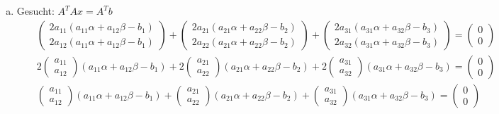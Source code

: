\documentclass[11pt]{article} %
\begin{document}
\begin{enumerate}[a)]
\item Gesucht: $A^TAx = A^Tb$
\begin{eqnarray*}
&&\begin{pmatrix} 2a_{11}(a_{11}\alpha + a_{12}\beta - b_1) \\ 2a_{12}(a_{11}\alpha + a_{12}\beta - b_1)
\end{pmatrix} + 
\begin{pmatrix} 2a_{21}(a_{21}\alpha + a_{22}\beta - b_2) \\  2a_{22}(a_{21}\alpha + a_{22}\beta - b_2)
\end{pmatrix} + 
\begin{pmatrix} 2a_{31}(a_{31}\alpha + a_{32}\beta - b_3) \\ 2a_{32}(a_{31}\alpha + a_{32}\beta - b_3)
\end{pmatrix} = \begin{pmatrix}0 \\ 0 \end{pmatrix} \\
&& 2\begin{pmatrix}a_{11}\\a_{12}\end{pmatrix}(a_{11}\alpha + a_{12}\beta - b_1)
+ 2\begin{pmatrix}a_{21}\\a_{22}\end{pmatrix}(a_{21}\alpha + a_{22}\beta - b_2)
+ 2\begin{pmatrix}a_{31}\\a_{32}\end{pmatrix}(a_{31}\alpha + a_{32}\beta - b_3)
= \begin{pmatrix}0 \\ 0 \end{pmatrix} \\
&& \begin{pmatrix}a_{11}\\a_{12}\end{pmatrix}(a_{11}\alpha + a_{12}\beta - b_1)
+ \begin{pmatrix}a_{21}\\a_{22}\end{pmatrix}(a_{21}\alpha + a_{22}\beta - b_2)
+ \begin{pmatrix}a_{31}\\a_{32}\end{pmatrix}(a_{31}\alpha + a_{32}\beta - b_3)
= \begin{pmatrix}0 \\ 0 \end{pmatrix} \\

\end{eqnarray*}
\end{enumerate}
\end{document}
